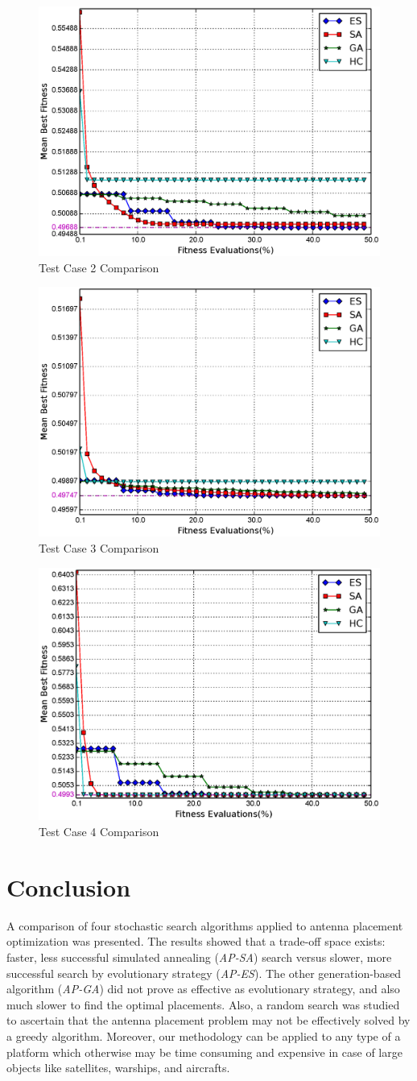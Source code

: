 \documentclass[conference]{IEEEtran}
\begin{document}
\begin{figure}
    \begin{center}
        \includegraphics[width=.41\textwidth]{FIG/tc2_mf.eps}
\end{center}
\caption{Test Case 2 Comparison}
\label{fig:tc2_sp}
\end{figure}
\begin{figure}
    \begin{center}
        \includegraphics[width=.41\textwidth]{FIG/tc3_mf.eps}
\end{center}
\caption{Test Case 3 Comparison}
\label{fig:tc3_sp}
\end{figure}

\begin{figure}
    \begin{center}
        \includegraphics[width=.41\textwidth]{FIG/tc4_mf.eps}
\end{center}
\caption{Test Case 4 Comparison}
\label{fig:tc4_sp}
\end{figure}


\section{Conclusion}
A comparison of four stochastic search algorithms applied to antenna placement optimization was presented. The results showed that a trade-off space exists: faster, less successful simulated annealing (\textit{AP-SA}) search versus slower, more successful search by evolutionary strategy (\textit{AP-ES}). The other generation-based algorithm (\textit{AP-GA}) did not prove as effective as evolutionary strategy, and also much slower to find the optimal placements. Also, a random search was studied to ascertain that the antenna placement problem may not be effectively solved by a greedy algorithm. Moreover, our methodology can be applied to any type of a platform which otherwise may be time consuming and expensive in case of large objects like satellites, warships, and aircrafts. 
\end{document}
